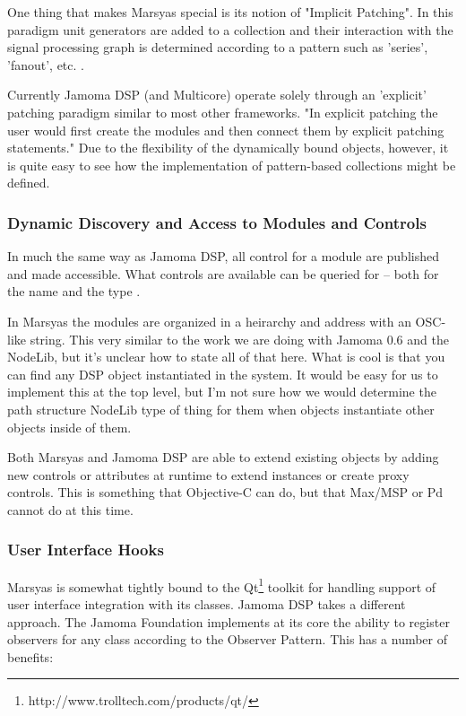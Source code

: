 \documentclass[twoside,10pt]{article}
\begin{document}
One thing that makes Marsyas special is its notion of "Implicit Patching".  In this paradigm unit generators are added to a collection and their interaction with the signal processing graph is determined according to a pattern such as 'series', 'fanout', etc. \cite{Bray:2005}.

Currently Jamoma DSP (and Multicore) operate solely through an 'explicit' patching paradigm similar to most other frameworks.  "In explicit patching the user would first create the modules and then connect them by explicit patching statements."  Due to the flexibility of the dynamically bound objects, however, it is quite easy to see how the implementation of pattern-based collections might be defined.


\subsubsection{Dynamic Discovery and Access to Modules and Controls}

In much the same way as Jamoma DSP, all control for a module are published and made accessible.  What controls are available can be queried for -- both for the name and the type  \cite{Tzanetakis:2006}.  

In Marsyas the modules are organized in a heirarchy and address with an OSC-like string.  This very similar to the work we are doing with Jamoma 0.6 and the NodeLib, but it's unclear how to state all of that here.  What is cool is that you can find any DSP object instantiated in the system.  It would be easy for us to implement this at the top level, but I'm not sure how we would determine the path structure NodeLib type of thing for them when objects instantiate other objects inside of them.

Both Marsyas and Jamoma DSP are able to extend existing objects by adding new controls or attributes at runtime to extend instances or create proxy controls.  This is something that Objective-C can do, but that Max/MSP or Pd cannot do at this time.

\subsubsection{User Interface Hooks}

Marsyas is somewhat tightly bound to the Qt\footnote{http://www.trolltech.com/products/qt/} toolkit for handling support of user interface integration with its classes.  Jamoma DSP takes a different approach.  The Jamoma Foundation implements at its core the ability to register observers for any class according to the Observer Pattern\cite{Gamma:1995}.  This has a number of benefits:
\end{document}
